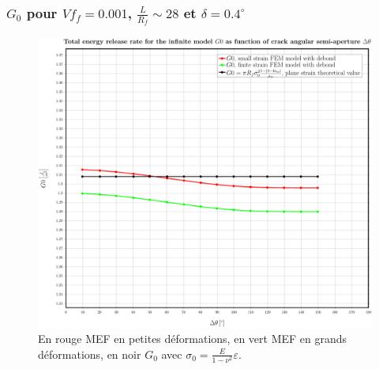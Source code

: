 \documentclass[first,firstsupp,lastsupp,handout,last,hyperref,table]{ETHclass}
\begin{document}
\begin{frame}
\frametitle{\small $G_{0}$ pour $Vf_{f}=0.001$, $\frac{L}{R_{f}}\sim28$ et $\delta=0.4^{\circ}$}
\vspace{-0.5cm}
\centering
\captionsetup[figure]{font=scriptsize,labelfont=scriptsize}
\begin{figure}[!h]
\centering
\includegraphics[height=0.7\textheight]{2017-06-23_AbqRunSummary_SingleFiberEqRfSmallFiniteStrain_G0_Summary.pdf}
  \caption{\scriptsize En rouge MEF en petites d\'eformations, en vert MEF en grands d\'eformations, en noir $G_{0}$ avec $\sigma_{0}=\frac{E}{1-\nu^{2}}\varepsilon$.}
  \label{fig:res1}
\end{figure}
\end{frame}
\end{document}
